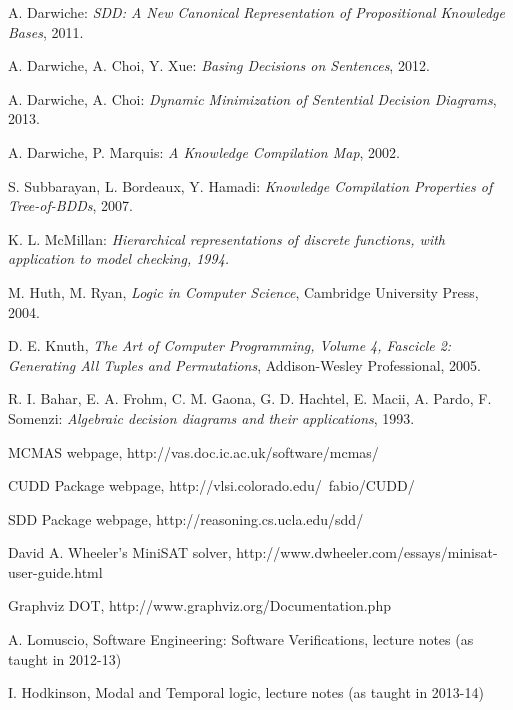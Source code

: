 \documentclass[12]{article}
\begin{document}
\begin{thebibliography}{9}


A. Darwiche:\emph{ SDD: A New Canonical Representation of Propositional Knowledge Bases}, 2011.

A. Darwiche, A. Choi, Y. Xue: \emph{Basing Decisions on Sentences}, 2012.

A. Darwiche, A. Choi: \textit{Dynamic Minimization of Sentential Decision Diagrams}, 2013.

  A. Darwiche, P. Marquis:
  \emph{A Knowledge Compilation Map}, 2002.

S. Subbarayan, L. Bordeaux, Y. Hamadi:\textit{
Knowledge Compilation Properties of Tree-of-BDDs}, 2007.

K. L. McMillan:\textit{ Hierarchical representations of discrete functions, with application to model checking, 1994.
}

 M. Huth, M. Ryan, 
\emph{Logic in Computer Science},
Cambridge University Press, 2004.

 D. E. Knuth, \textit{The Art of Computer Programming, Volume
4, Fascicle 2: Generating All Tuples and Permutations}, Addison-Wesley Professional, 2005.

  R. I. Bahar, E. A. Frohm, C. M. Gaona, G. D. Hachtel, E. Macii, A. Pardo, F. Somenzi:\textit{
Algebraic decision diagrams and their applications}, 1993.

 MCMAS webpage, http://vas.doc.ic.ac.uk/software/mcmas/

 CUDD Package webpage, http://vlsi.colorado.edu/~fabio/CUDD/

 SDD Package webpage, http://reasoning.cs.ucla.edu/sdd/

 David A. Wheeler's MiniSAT solver,  http://www.dwheeler.com/essays/minisat-user-guide.html

Graphviz DOT, http://www.graphviz.org/Documentation.php

 A. Lomuscio, Software Engineering: Software Verifications, lecture notes (as taught in 2012-13)

 I. Hodkinson, Modal and Temporal logic, lecture notes (as taught in 2013-14)

\end{thebibliography}
\end{document}
